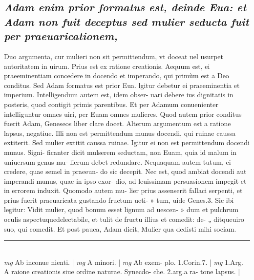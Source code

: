 \documentclass{article}
\begin{document}
\begin{pages}
\subsection*{\textit{Adam enim prior formatus est, deinde Eua: et Adam non fuit deceptus sed mulier seducta fuit per praeuaricationem, }}\pstart Duo argumenta, cur mulieri non sit permittendum, vt doceat uel usurpet autoritatem in uirum. Prius est ex ratione creationis. Aequum est, ei praeeminentiam concedere in docendo et imperando, qui primùm est a Deo conditus. Sed Adam formatus est prior Eua. lgitur debetur ei praeeminentia et imperium. Intelligendum autem est, idem obser- uari debere ius dignitatis in posteris, quod contigit primis parentibus. Et per Adamum conuenienter intelliguntur omnes uiri, per Euam omnes mulieres. Quod autem prior conditus fuerit Adam, Geneseos liber clare docet. Alterum argumentum est a ratione lapsus, negatiue. Illi non est permittendum munus docendi, qui ruinae caussa extiterit. Sed mulier extitit caussa ruinae. Igitur ei non est permittendum docendi munus. Signi- ficanter dicit mulserem seductam, non Euam, quia id malum in uniuersum genus mu- lierum debet redundare. Nequaquam autem tutum, ei credere, quae semel in praeeun- do sic decepit. Nec est, quod ambiat docendi aut imperandi munus, quae in ipso exor- dio, ad leuissimam persuasionem impegit et in errorem induxit. Quomodo autem mu- lier prius assenserit fallaci serpenti, et prius fuerit praeuaricata gustando fructum ueti- » tum, uide Genes.3. Sic ibi legitur: Vidit mulier, quod bonum esset lignum ad uescen- » dum et pulchrum oculis aspectuquedelectabile, et tulit de fructu illius et comedit: de- „ ditqueuiro suo, qui comedit. Et post pauca, Adam dicit, Mulier qua dedisti mihi sociam.  \pend
\vspace{0.5cm}\noindent
\vspace{0.2cm}\rule{1cm}{0.2pt}\\ 
\hspace{0.2cm}\textit{mg}
\footnotesize Ab inconue nienti. 
\normalsize| 
\hspace{0.2cm}\textit{mg}
\footnotesize A minori. 
\normalsize| 
\hspace{0.2cm}\textit{mg}
\footnotesize Ab exem- plo. 1.Corin.7. 
\normalsize| 
\hspace{0.2cm}\textit{mg}
\footnotesize 1.Arg. A raione creationis siue ordine naturae. Synecdo- che. 2.arg.a ra- tone lapsus. 
\normalsize| 

\end{pages}
\end{document}
